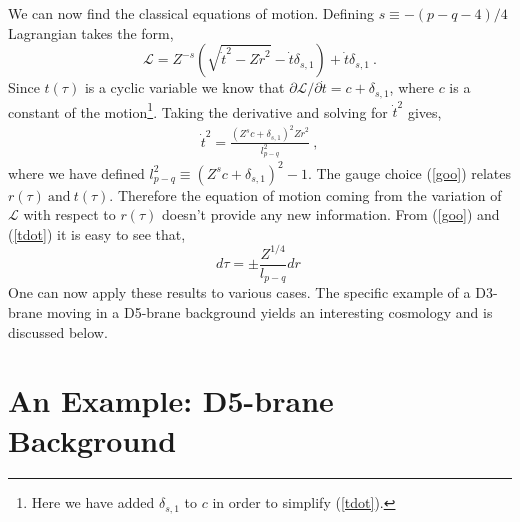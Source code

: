 \documentclass[a4paper,12pt]{article}
\newcommand{\fL}{\mathcal{L}}
\newcommand{\rds}{\dot{r}^2}
\newcommand{\td}{\dot{t}}
\newcommand{\tds}{\dot{t}^2}
\begin{document}
We can now find the classical equations of motion.  Defining
$s \equiv -(p-q-4)/4$ Lagrangian takes the form, 
$$
\fL  = Z^{-s} ( \sqrt{ \tds - Z \rds } - \td \delta_{s,1})+\td \delta_{s,1} \ .
$$
Since $t(\tau)$ is a cyclic variable we know that 
$\partial \fL / \partial \td = c + \delta_{s,1}$, 
where $c$ is a constant of the motion\footnote{Here we have added
$\delta_{s,1}$ to $c$ in order to simplify (\ref{tdot}).}.  Taking
the derivative and solving for $\tds$ gives,
\begin{eqnarray}
\tds = \frac{(Z^{s}c + \delta_{s,1})^2 Z \rds}{l_{p-q}^2} \ ,
\label{tdot}
\end{eqnarray}
where we have defined $l_{p-q}^2 \equiv (Z^{s} c + \delta_{s,1})^2 - 1$.
The gauge choice (\ref{goo}) relates $r(\tau) \ \mbox{and} \ t(\tau)$.
Therefore the equation of motion coming from the variation of $\fL$
with respect to
$r(\tau)$ doesn't provide any new information.  From (\ref{goo})
and (\ref{tdot}) it is easy to see that,
\begin{equation}
d \tau = \pm \frac{Z^{1/4}}{l_{p-q}} dr \
\label{dtau}
\end{equation}
One can now apply these results to various cases.  The specific
example of a D3-brane moving in a D5-brane background yields an
interesting cosmology and is discussed below.

%
%
\section{An Example:  D5-brane Background}
%
%
 
\end{document}
